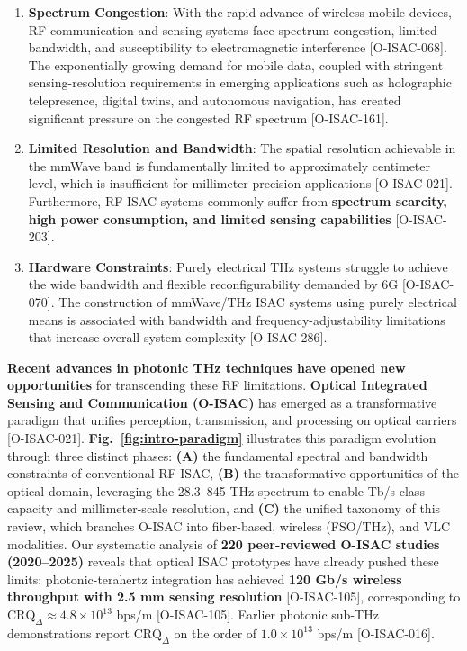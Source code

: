 \begin{enumerate}
\item \textbf{Spectrum Congestion}: With the rapid advance of wireless mobile devices, RF communication and sensing systems face spectrum congestion, limited bandwidth, and susceptibility to electromagnetic interference [O-ISAC-068]. The exponentially growing demand for mobile data, coupled with stringent sensing-resolution requirements in emerging applications such as holographic telepresence, digital twins, and autonomous navigation, has created significant pressure on the congested RF spectrum [O-ISAC-161].
\item \textbf{Limited Resolution and Bandwidth}: The spatial resolution achievable in the mmWave band is fundamentally limited to approximately centimeter level, which is insufficient for millimeter-precision applications [O-ISAC-021]. Furthermore, RF-ISAC systems commonly suffer from \textbf{spectrum scarcity, high power consumption, and limited sensing capabilities} [O-ISAC-203].
\item \textbf{Hardware Constraints}: Purely electrical THz systems struggle to achieve the wide bandwidth and flexible reconfigurability demanded by 6G [O-ISAC-070]. The construction of mmWave/THz ISAC systems using purely electrical means is associated with bandwidth and frequency-adjustability limitations that increase overall system complexity [O-ISAC-286].
\end{enumerate}

\textbf{Recent advances in photonic THz techniques have opened new opportunities} for transcending these RF limitations. \textbf{Optical Integrated Sensing and Communication (O-ISAC)} has emerged as a transformative paradigm that unifies perception, transmission, and processing on optical carriers [O-ISAC-021]. \textbf{Fig.~\ref{fig:intro-paradigm}} illustrates this paradigm evolution through three distinct phases: \textbf{(A)} the fundamental spectral and bandwidth constraints of conventional RF-ISAC, \textbf{(B)} the transformative opportunities of the optical domain, leveraging the 28.3--845 THz spectrum to enable Tb/s-class capacity and millimeter-scale resolution, and \textbf{(C)} the unified taxonomy of this review, which branches O-ISAC into fiber-based, wireless (FSO/THz), and VLC modalities. Our systematic analysis of \textbf{220 peer-reviewed O-ISAC studies (2020--2025)} reveals that optical ISAC prototypes have already pushed these limits: photonic-terahertz integration has achieved \textbf{120 Gb/s wireless throughput with 2.5 mm sensing resolution} [O-ISAC-105], corresponding to $\mathrm{CRQ}_{\Delta} \approx 4.8\times10^{13}$ bps/m [O-ISAC-105]. Earlier photonic sub-THz demonstrations report $\mathrm{CRQ}_{\Delta}$ on the order of $1.0\times10^{13}$ bps/m [O-ISAC-016].

